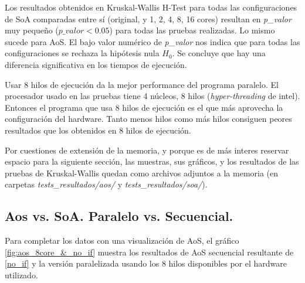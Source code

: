 \documentclass{article}
\begin{document}
Los resultados obtenidos en Kruskal-Wallis H-Test para todas las configuraciones de SoA comparadas entre sí
(original, y 1, 2, 4, 8, 16 cores) resultan en \textit{p\_valor} muy pequeño (${p\_valor} < 0.05$) para todas
las pruebas realizadas. Lo mismo sucede para AoS. El bajo valor numérico de \textit{p\_valor} nos indica que para todas las configuraciones se rechaza
la hipótesis nula ${H_0}$. Se concluye que hay una diferencia significativa
en los tiempos de ejecución.

Usar 8 hilos de ejecución da la mejor performance del programa paralelo. El procesador
usado en las pruebas tiene 4 núcleos, 8 hilos (\textit{hyper-threading} de intel).
Entonces el programa que usa 8 hilos de ejecución es el que más aprovecha la configuración del hardware.
Tanto menos hilos como más hilos consiguen peores resultados que los obtenidos en 8 hilos de ejecución.

Por cuestiones de extensión de la memoria, y porque es de más interes reservar espacio
para la siguiente sección, las muestras, sus gráficos, y los resultados de las pruebas de Kruskal-Wallis quedan como archivos adjuntos a la memoria (en carpetas \textit{tests\_resultados/aos/}
y \textit{tests\_resultados/soa/}).

\subsection{Aos vs. SoA. Paralelo vs. Secuencial.\label{t-test}}
Para completar los datos con una visualización de AoS, el gráfico \ref{fig:aos_8core_&_no_if} muestra los resultados
de AoS secuencial resultante de \ref{no_if} y la versión paralelizada usando los 8 hilos disponibles
por el hardware utilizado.
\end{document}
